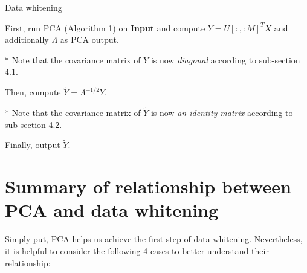 \documentclass{article}
\begin{document}

\vspace{3mm}
\begin{algorithm}[H]
	\DontPrintSemicolon
	
	\caption{Data whitening}
	
	\vspace{1mm}
	
	
    First, run PCA (Algorithm 1) on \textbf{Input} and compute $Y = U[:,{:}M]^T X$ and additionally $\Lambda$ as PCA output.
    
    \vspace{1mm}
    * Note that the covariance matrix of $Y$ is now \textit{diagonal} according to sub-section 4.1.
    
    \vspace{1mm}
    Then, compute $\tilde{Y} = \Lambda^{-1/2} Y$. 
    
    \vspace{1mm}
    * Note that the covariance matrix of $\tilde{Y}$ is now \textit{an identity matrix} according to sub-section 4.2.  
    
    \vspace{1mm}
   	Finally, output $\tilde{Y}$.
    
    \vspace{1mm}
\end{algorithm}

\section{Summary of relationship between PCA and data whitening}

Simply put, PCA helps us achieve the first step of data whitening. Nevertheless, it is helpful to consider the following 4 cases to better understand their relationship:
\end{document}

